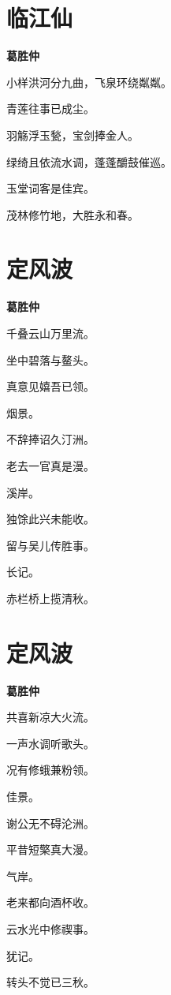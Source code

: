 \documentclass[12pt,a4paper]{ctexbook}
\begin{document}
\section{临江仙}
\textbf{葛胜仲}\par\vspace{0.5em}
小样洪河分九曲，飞泉环绕粼粼。\par
青莲往事已成尘。\par
羽觞浮玉甃，宝剑捧金人。\par
绿绮且依流水调，蓬蓬釂鼓催巡。\par
玉堂词客是佳宾。\par
茂林修竹地，大胜永和春。\par

\section{定风波}
\textbf{葛胜仲}\par\vspace{0.5em}
千叠云山万里流。\par
坐中碧落与鳌头。\par
真意见嬉吾已领。\par
烟景。\par
不辞捧诏久汀洲。\par
老去一官真是漫。\par
溪岸。\par
独馀此兴未能收。\par
留与吴儿传胜事。\par
长记。\par
赤栏桥上揽清秋。\par

\section{定风波}
\textbf{葛胜仲}\par\vspace{0.5em}
共喜新凉大火流。\par
一声水调听歌头。\par
况有修蛾兼粉领。\par
佳景。\par
谢公无不碍沦洲。\par
平昔短檠真大漫。\par
气岸。\par
老来都向酒杯收。\par
云水光中修禊事。\par
犹记。\par
转头不觉已三秋。\par
\end{document}
